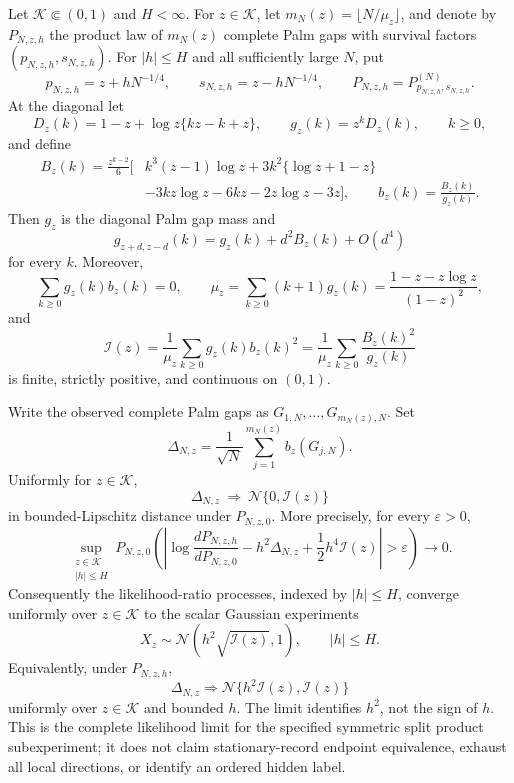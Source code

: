 \begin{maintheorem}
\label{thm:singular-exchange-limit-experiment-main}
Let \(\mathcal K\Subset(0,1)\) and \(H<\infty\).  For
\(z\in\mathcal K\), let
\(m_N(z)=\lfloor N/\mu_z\rfloor\), and denote by \(P_{N,z,h}\) the product
law of \(m_N(z)\) complete Palm gaps with survival factors
\((p_{N,z,h},s_{N,z,h})\).  For \(|h|\le H\) and all sufficiently large
\(N\), put
\[
 p_{N,z,h}=z+hN^{-1/4},\qquad
 s_{N,z,h}=z-hN^{-1/4},\qquad
 P_{N,z,h}=P_{p_{N,z,h},s_{N,z,h}}^{(N)}.
\tag{SE1}
\]
At the diagonal let
\[
 D_z(k)=1-z+\log z\{kz-k+z\},\qquad
 g_z(k)=z^kD_z(k),\qquad k\ge0,
\tag{SE2}
\]
and define
\[
\begin{split}
B_z(k)=\frac{z^{k-2}}6\bigl[&
k^3(z-1)\log z+3k^2\{\log z+1-z\}\\
&-3kz\log z-6kz-2z\log z-3z\bigr],
\qquad b_z(k)=\frac{B_z(k)}{g_z(k)} .
\end{split}
\tag{SE3}
\]
Then \(g_z\) is the diagonal Palm gap mass and
\[
 g_{z+d,z-d}(k)=g_z(k)+d^2B_z(k)+O(d^4)
\tag{SE4}
\]
for every \(k\).  Moreover,
\[
 \sum_{k\ge0}g_z(k)b_z(k)=0,\qquad
 \mu_z=\sum_{k\ge0}(k+1)g_z(k)
 =\frac{1-z-z\log z}{(1-z)^2},
\tag{SE5}
\]
and
\[
 \mathcal I(z)=\frac1{\mu_z}
 \sum_{k\ge0}g_z(k)b_z(k)^2
 =\frac1{\mu_z}\sum_{k\ge0}\frac{B_z(k)^2}{g_z(k)}
\tag{SE6}
\]
is finite, strictly positive, and continuous on \((0,1)\).

Write the observed complete Palm gaps as
\(G_{1,N},\ldots,G_{m_N(z),N}\).  Set
\[
 \Delta_{N,z}=\frac1{\sqrt N}
 \sum_{j=1}^{m_N(z)}b_z(G_{j,N}).
\tag{SE7}
\]
Uniformly for \(z\in\mathcal K\),
\[
 \Delta_{N,z}\ \Longrightarrow\
 \mathcal N\{0,\mathcal I(z)\}
\tag{SE8}
\]
in bounded-Lipschitz distance under \(P_{N,z,0}\).  More precisely, for every
\(\varepsilon>0\),
\[
\sup_{\substack{z\in\mathcal K\\ |h|\le H}}
P_{N,z,0}\!\left(
\left|
\log\frac{dP_{N,z,h}}{dP_{N,z,0}}
-h^2\Delta_{N,z}
+\frac12h^4\mathcal I(z)
\right|>\varepsilon
\right)\longrightarrow0 .
\tag{SE9}
\]
Consequently the likelihood-ratio processes, indexed by \(|h|\le H\),
converge uniformly over \(z\in\mathcal K\) to the scalar Gaussian experiments
\[
 X_z\sim\mathcal N\!\left(h^2\sqrt{\mathcal I(z)},1\right),
\qquad |h|\le H.
\tag{SE10}
\]
Equivalently, under \(P_{N,z,h}\),
\[
 \Delta_{N,z}\Longrightarrow
 \mathcal N\{h^2\mathcal I(z),\mathcal I(z)\}
\tag{SE11}
\]
uniformly over \(z\in\mathcal K\) and bounded \(h\).
The limit identifies \(h^2\), not the sign of \(h\).  This is the complete
likelihood limit for the specified symmetric split product subexperiment; it
does not claim stationary-record endpoint equivalence, exhaust all local
directions, or identify an ordered hidden label.
\end{maintheorem}

